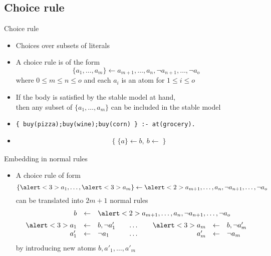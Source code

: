 \subsection{Choice rule}
\begin{frame}[fragile]{Choice rule}
  \label{eqn:choice:rule}
  \begin{itemize}
  \item {} Choices over subsets of literals
  \item {} A \alert{choice rule} is of the form
    \[
    \{a_1,\dots,a_m\}\leftarrow a_{m+1},\dots,a_n,\neg a_{n+1},\dots,\neg a_o
    \]
    where $0\leq m\leq n\leq o$ and each $a_i$ is an atom for $1\leq i\leq o$
    \smallskip
  \item<2->  If the body is satisfied by the stable model at hand,\\
    then any subset of $\{a_1,\dots,a_m\}$ can be included in the stable model
    \medskip
  \item<3->   %
\begin{lstlisting}[basicstyle=\ttfamily\small]
{ buy(pizza);buy(wine);buy(corn) } :- at(grocery).
\end{lstlisting}
  \item<4-> 
    \begin{align*}
      & \{\;\{a\}\leftarrow b,\ b\leftarrow\;\}
    \end{align*}
  \end{itemize}
\end{frame}
\begin{frame}{Embedding in normal rules}
  \begin{itemize}
  \item A choice rule of form
    \[
    \{\alert<3>{a_1},\dots,\alert<3>{a_m}\}\leftarrow \alert<2>{a_{m+1},\dots,a_n,\neg a_{n+1},\dots,\neg a_o}
    \]
    can be translated into $2m+1$ normal rules
    \[
    \begin{array}{rcl@{\qquad}c@{\qquad}rcl}
      b&\leftarrow&\multicolumn{5}{l}{\alert<2>{a_{m+1},\dots,a_n, \neg a_{n+1},\dots,\neg a_o}}
      \\[5pt]
      \alert<3>{a_1}&\leftarrow&b,\neg a'_1&\dots&\alert<3>{a_m}&\leftarrow&b,\neg a'_m\\
               a'_1 &\leftarrow&  \neg a_1 &\dots&         a'_m &\leftarrow&  \neg a_m
    \end{array}
    \]
    by introducing new atoms $b,a'_1,\dots,a'_m$
  \end{itemize}
\end{frame}
